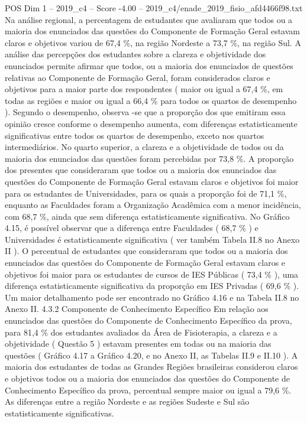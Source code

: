 \begin{textsample}{POS Dim 1 – 2019\_c4 – Score -4.00 – 2019\_c4/enade\_2019\_fisio\_afd4466f98.txt}
Na análise regional, a percentagem de estudantes que avaliaram que todos ou a maioria dos enunciados das questões do Componente de Formação Geral estavam claros e objetivos variou de 67,4 \%, na região Nordeste a 73,7 \%, na região Sul.
A análise das percepções dos estudantes sobre a clareza e objetividade dos enunciados permite afirmar que todos, ou a maioria dos enunciados de questões relativas ao Componente de Formação Geral, foram considerados claros e objetivos para a maior parte dos respondentes ( maior ou igual a 67,4 \%, em todas as regiões e maior ou igual a 66,4 \% para todos os quartos de desempenho ).
Segundo o desempenho, observa -se que a proporção dos que emitiram essa opinião cresce conforme o desempenho aumenta, com diferenças estatisticamente significativas entre todos os quartos de desempenho, exceto nos quartos intermediários.
No quarto superior, a clareza e a objetividade de todos ou da maioria dos enunciados das questões foram percebidas por 73,8 \%.
A proporção dos presentes que consideraram que todos ou a maioria dos enunciados das questões do Componente de Formação Geral estavam claros e objetivos foi maior para os estudantes de Universidades, para os quais a proporção foi de 71,1 \%, enquanto as Faculdades foram a Organização Acadêmica com a menor incidência, com 68,7 \%, ainda que sem diferença estatisticamente significativa.
No Gráfico 4.15, é possível observar que a diferença entre Faculdades ( 68,7 \% ) e Universidades é estatisticamente significativa ( ver também Tabela II.8 no Anexo II ).
O percentual de estudantes que consideraram que todos ou a maioria dos enunciados das questões do Componente de Formação Geral estavam claros e objetivos foi maior para os estudantes de cursos de IES Públicas ( 73,4 \% ), uma diferença estatisticamente significativa da proporção em IES Privadas ( 69,6 \% ).
Um maior detalhamento pode ser encontrado no Gráfico 4.16 e na Tabela II.8 no Anexo II. 4.3.2 Componente de Conhecimento Específico Em relação aos enunciados das questões do Componente de Conhecimento Específico da prova, para 81,4 \% dos estudantes avaliados da Área de Fisioterapia, a clareza e a objetividade ( Questão 5 ) estavam presentes em todas ou na maioria das questões ( Gráfico 4.17 a Gráfico 4.20, e no Anexo II, as Tabelas II.9 e II.10 ).
A maioria dos estudantes de todas as Grandes Regiões brasileiras considerou claros e objetivos todos ou a maioria dos enunciados das questões do Componente de Conhecimento Específico da prova, percentual sempre maior ou igual a 79,6 \%.
As diferenças entre a região Nordeste e as regiões Sudeste e Sul são estatisticamente significativas.

\end{textsample}
